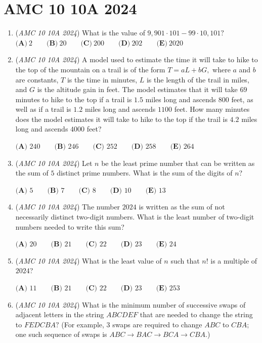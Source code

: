 \section{AMC 10 10A 2024}
        \begin{enumerate}
        	\item (\textit{AMC 10 10A 2024}) What is the value of $9,901\cdot101-99\cdot10,101?$
$\textbf{(A)}~2\qquad\textbf{(B)}~20\qquad\textbf{(C)}~200\qquad\textbf{(D)}~202\qquad\textbf{(E)}~2020$


	\item (\textit{AMC 10 10A 2024}) A model used to estimate the time it will take to hike to the top of the mountain on a trail is of the form $T=aL+bG,$ where $a$ and $b$ are constants, $T$ is the time in minutes, $L$ is the length of the trail in miles, and $G$ is the altitude gain in feet. The model estimates that it will take $69$ minutes to hike to the top if a trail is $1.5$ miles long and ascends $800$ feet, as well as if a trail is $1.2$ miles long and ascends $1100$ feet. How many minutes does the model estimates it will take to hike to the top if the trail is $4.2$ miles long and ascends $4000$ feet?


 $\textbf{(A) }240\qquad\textbf{(B) }246\qquad\textbf{(C) }252\qquad\textbf{(D) }258\qquad\textbf{(E) }264$


	\item (\textit{AMC 10 10A 2024}) Let $n$ be the least prime number that can be written as the sum of $5$ distinct prime numbers. What is
the sum of the digits of $n$?


 $\textbf{(A) }5\qquad\textbf{(B) }7\qquad\textbf{(C) }8\qquad\textbf{(D) }10\qquad\textbf{(E) }13$


	\item (\textit{AMC 10 10A 2024}) The number $2024$ is written as the sum of not necessarily distinct two-digit numbers. What is the least number of two-digit numbers needed to write this sum?


 $\textbf{(A) }20\qquad\textbf{(B) }21\qquad\textbf{(C) }22\qquad\textbf{(D) }23\qquad\textbf{(E) }24$


	\item (\textit{AMC 10 10A 2024}) What is the least value of $n$ such that $n!$ is a multiple of $2024$?


 $\textbf{(A) } 11\qquad\textbf{(B) } 21\qquad\textbf{(C) } 22\qquad\textbf{(D) } 23\qquad\textbf{(E) } 253$


	\item (\textit{AMC 10 10A 2024}) What is the minimum number of successive swaps of adjacent letters in the string $ABCDEF$ that are needed to change the string to $FEDCBA?$ (For example, $3$ swaps are required to change $ABC$ to $CBA;$ one such sequence of swaps is
$ABC\to BAC\to BCA\to CBA.$)



\end{enumerate}
